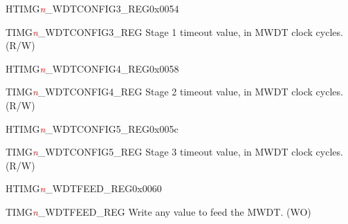 \begin{register}{H}{TIMG\textcolor{red}{\it{n}}\_WDTCONFIG3\_REG}{0x0054}\label{regdesc:TIMERSWDTCONFIG3REG}
%
\regnewline%
\begin{regdesc}\begin{reglist}
\item [TIMG\textcolor{red}{\it{n}}\_WDTCONFIG3\_REG]Stage 1 timeout value, in MWDT clock cycles. (R/W)
\end{reglist}\end{regdesc}
\end{register}


\begin{register}{H}{TIMG\textcolor{red}{\it{n}}\_WDTCONFIG4\_REG}{0x0058}\label{regdesc:TIMERSWDTCONFIG4REG}
%
\regnewline%
\begin{regdesc}\begin{reglist}
\item [TIMG\textcolor{red}{\it{n}}\_WDTCONFIG4\_REG]Stage 2 timeout value, in MWDT clock cycles. (R/W)
\end{reglist}\end{regdesc}
\end{register}


\begin{register}{H}{TIMG\textcolor{red}{\it{n}}\_WDTCONFIG5\_REG}{0x005c}\label{regdesc:TIMERSWDTCONFIG5REG}
%
\regnewline%
\begin{regdesc}\begin{reglist}
\item [TIMG\textcolor{red}{\it{n}}\_WDTCONFIG5\_REG]Stage 3 timeout value, in MWDT clock cycles. (R/W)
\end{reglist}\end{regdesc}
\end{register}


\begin{register}{H}{TIMG\textcolor{red}{\it{n}}\_WDTFEED\_REG}{0x0060}\label{regdesc:TIMERSWDTFEEDREG}
%
\regnewline%
\begin{regdesc}\begin{reglist}
\item [TIMG\textcolor{red}{\it{n}}\_WDTFEED\_REG]Write any value to feed the MWDT. (WO)
\end{reglist}\end{regdesc}
\end{register}


